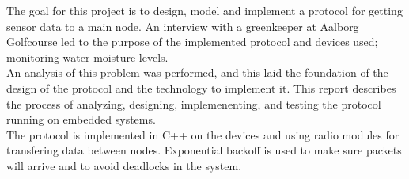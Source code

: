 The goal for this project is to design, model and implement a protocol for getting sensor data to a main node. An interview with a greenkeeper at Aalborg Golfcourse led to the purpose of the implemented protocol and devices used; monitoring water moisture levels. \\
An analysis of this problem was performed, and this laid the foundation of the design of the protocol and the technology to implement it.
This report describes the process of analyzing, designing, implemenenting, and testing the protocol running on embedded systems. \\
The protocol is implemented in C++ on the devices and using radio modules for transfering data between nodes. Exponential backoff is used to make sure packets will arrive and to avoid deadlocks in the system. \\ 